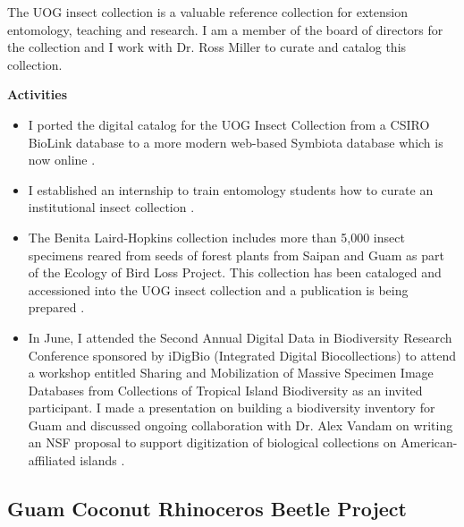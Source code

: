 \documentclass[12pt,english]{scrartcl}
\newcommand{\activities}{\medskip\textbf{Activities}}
\begin{document}
\begin{refsection}

The UOG insect collection is a valuable reference collection for extension
entomology, teaching and research. I am a member of the board of directors
for the collection and I work with Dr. Ross Miller to curate and catalog
this collection.

\activities

\begin{itemize}

\item I ported the digital catalog for the UOG Insect Collection from a
CSIRO BioLink database to a more modern web-based Symbiota database
which is now online \cite{moore_scan_2018}.

\item I established an internship to train entomology students how to curate
an institutional insect collection \cite{moore_internship_2018}.

\item The Benita Laird-Hopkins collection includes more than 5,000 insect
specimens reared from seeds of forest plants from Saipan and Guam
as part of the Ecology of Bird Loss Project. This collection has been
cataloged and accessioned into the UOG insect collection and a publication
is being prepared \cite{laird-hopkins_[preparation]_2018}.

\item In June, I attended the Second Annual Digital Data in Biodiversity
Research Conference sponsored by iDigBio (Integrated Digital Biocollections)
to attend a workshop entitled Sharing and Mobilization of Massive
Specimen Image Databases from Collections of Tropical Island Biodiversity
as an invited participant. I made a presentation on building a biodiversity
inventory for Guam \cite{moore_building_2018-1} and discussed ongoing
collaboration with Dr. Alex Vandam on writing an NSF proposal to support
digitization of biological collections on American-affiliated islands
\cite{moore_trip_2018}.
\end{itemize}

\printbibliography

\end{refsection}

\subsection{Guam Coconut Rhinoceros Beetle Project}
\end{document}

